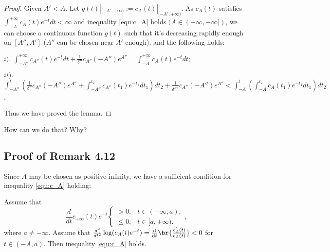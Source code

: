 \begin{proof}
Given $A'<A$. Let
$g(t)|_{[-A',+\infty)}:=c_{A}(t)|_{[-A',+\infty)}$. As $c_{A}(t)$
satisfies $\int_{-A}^{+\infty}c_{A}(t)e^{-t}dt<\infty$ and
inequality \ref{equ:c_A} holds $(A\in(-\infty,+\infty])$, we can
choose a continuous function $g(t)$ such that it's decreasing
rapidly enough on $[A'',A']$ ($A''$ can be chosen near $A'$ enough),
and the following holds:

\noindent $i).$ $\int_{-A''}^{+\infty}c_{A''}(t)e^{-t}dt+\frac{1}{\delta''}c_{A''}(-A'')e^{A''}=
\int_{-A}^{+\infty}c_{A}(t)e^{-t}dt$;\vspace{.2em}

\noindent $ii).$
$\int_{-A''}^{t}\left(\frac{1}{\delta''}c_{A''}(-A'')e^{A''}+\int_{-A''}^{t_{2}}c_{A''}(t_{1})e^{-t_{1}}dt_{1}\right)
dt_{2}+\frac{1}{{\delta''}^{2}}c_{A''}(-A'')e^{A''}<\int_{-A}^{t}\left(\int_{-A}^{t_{2}}c_{A}(t_{1})e^{-t_{1}}dt_{1}\right)
dt_{2}$.\vspace{.2em}

Thus we have proved the lemma.
\end{proof}

\begin{remark}[TODO I]
  How  can we do that? Why?
\end{remark}

\subsection{Proof of Remark 4.12}

Since $A$ may be chosen as positive infinity, we have a sufficient
condition for inequality \ref{equ:c_A} holding:

\begin{remark}[Remark 4.12]\label{r:c_A3}
Assume that 
\[\frac{d}{dt}c_{+\infty}(t)e^{-t}
  \begin{cases}
    >0, & t\in (-\infty,a),\\
    \leq 0, & t\in[a,+\infty).
  \end{cases},
\]
where $a\neq -\infty$.
Assume that $\frac{d^{2}}{dt^{2}}\log(c_{A}(t)e^{-t})=\Dif{t} \br{\frac{c'_A(t)}{c_A(t)}}<0$ for $t\in (-A,a)$.
Then inequality \ref{equ:c_A} holds.
\end{remark}


